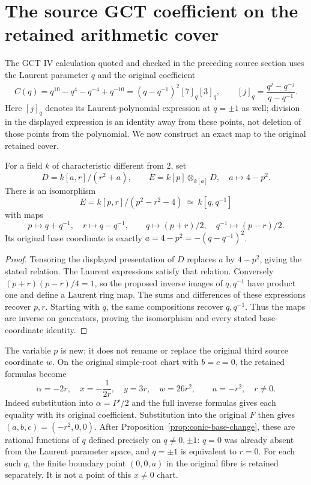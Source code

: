 \section{The source GCT coefficient on the retained arithmetic cover}
\label{sec:conic-arithmetic}
The GCT IV calculation quoted and checked in the preceding source
section uses the Laurent parameter $q$ and the original coefficient
\[
 C(q)=q^{10}-q^4-q^{-4}+q^{-10}
 =(q-q^{-1})^2[7]_q[3]_q,\qquad
 [j]_q=\frac{q^j-q^{-j}}{q-q^{-1}}.
\]
Here $[j]_q$ denotes its Laurent-polynomial expression at $q=\pm1$
as well; division in the displayed expression is an identity away
from these points, not deletion of those points from the polynomial.
We now construct an exact map to the original retained cover.

\begin{proposition}
\label{prop:conic-base-change}
For a field $k$ of characteristic different from $2$, set
\[
 D=k[a,r]/(r^2+a),\qquad
 E=k[p]\otimes_{k[a]}D,\quad a\longmapsto4-p^2.
\]
There is an isomorphism
\[
 E=k[p,r]/(p^2-r^2-4)\ \simeq\ k[q,q^{-1}]
\]
with maps
\[
 p\longmapsto q+q^{-1},\quad r\longmapsto q-q^{-1},
 \qquad q\longmapsto(p+r)/2,\quad q^{-1}\longmapsto(p-r)/2.
\]
Its original base coordinate is exactly
$a=4-p^2=-(q-q^{-1})^2$.
\end{proposition}
\begin{proof}
Tensoring the displayed presentation of $D$ replaces $a$ by $4-p^2$,
giving the stated relation. The Laurent expressions satisfy that
relation. Conversely $(p+r)(p-r)/4=1$, so the proposed inverse images
of $q,q^{-1}$ have product one and define a Laurent ring map.
The sums and differences of these expressions recover $p,r$.
Starting with $q$, the same compositions recover $q,q^{-1}$.
Thus the maps are inverse on generators, proving the isomorphism
and every stated base-coordinate identity.
\end{proof}

The variable $p$ is new; it does not rename or replace the original
third source coordinate $w$. On the original simple-root chart with
$b=c=0$, the retained formulas become
\[
 \alpha=-2r,\quad x=-\frac1{2r},\quad y=3r,\quad w=26r^2,
 \qquad a=-r^2,\quad r\ne0.
\]
Indeed substitution into $\alpha=P'/2$ and the full inverse formulas
gives each equality with its original coefficient.
Substitution into the original $F$ then gives $(a,b,c)=(-r^2,0,0)$.
After Proposition~\ref{prop:conic-base-change}, these are rational
functions of $q$ defined precisely on $q\ne0,\pm1$:
$q=0$ was already absent from the Laurent parameter space, and
$q=\pm1$ is equivalent to $r=0$.
For each such $q$, the finite boundary point $(0,0,a)$ in the original
fibre is retained separately. It is not a point of this $x\ne0$ chart.

